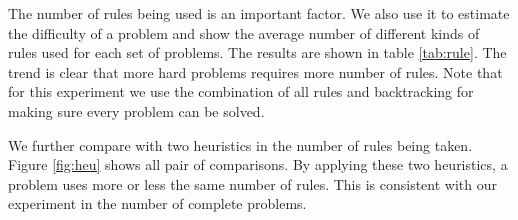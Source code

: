 \begin{table}[!h]
    \centering
    \caption{Average filled-in numbers for each problem level.}\label{tab:fill}
\end{table}

The number of rules being used is an important factor. We also use it to estimate the difficulty of a problem and show the average number of different kinds of rules used for each set of problems. The results are shown in table \ref{tab:rule}. The trend is clear that more hard problems requires more number of rules. Note that for this experiment we use the combination of all rules and backtracking for making sure every problem can be solved.

\begin{table}[!h]
    \centering
    \caption{Average number of rules used by problems in different levels. Here, r1: rule 1, r2: rule2, n2: naked double, n3: naked triple, bt: number of backtrackings.}\label{tab:rule}
\end{table}

We further compare with two heuristics in the number of rules being taken. Figure \ref{fig:heu} shows all pair of comparisons. By applying these two heuristics, a problem uses more or less the same number of rules. This is consistent with our experiment in the number of complete problems. 

